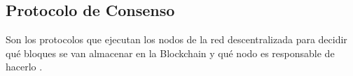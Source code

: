 \subsection{Protocolo de Consenso}

Son los protocolos que ejecutan los nodos de la red descentralizada para decidir qué bloques se van almacenar en la  Blockchain  y qué nodo es responsable de hacerlo
\cite[]{retamal_Blockchain_2017,badreddin_Blockchain_2018}.